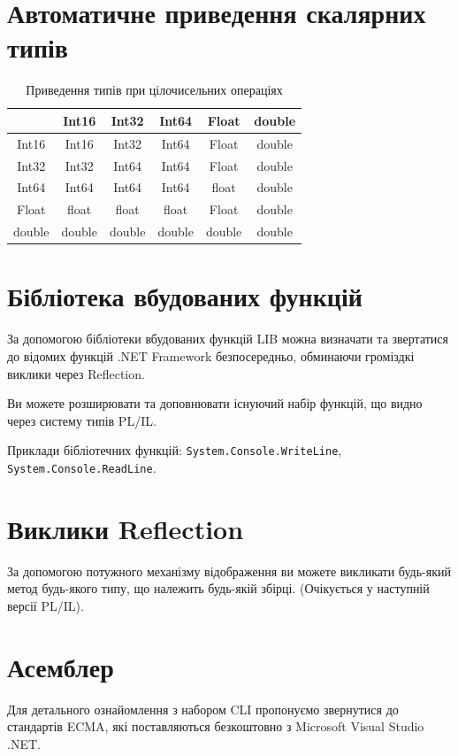 \documentclass{memoir}
\begin{document}
\section{Автоматичне приведення скалярних типів}
\begin{table}[h]
    \centering
    \caption{Приведення типів при цілочисельних операціях}
    \begin{tabular}{|c|c|c|c|c|c|}
        \hline
        & Int16 & Int32 & Int64 & Float & double \\
        \hline
        Int16 & Int16 & Int32 & Int64 & Float & double \\
        Int32 & Int32 & Int64 & Int64 & Float & double \\
        Int64 & Int64 & Int64 & Int64 & float & double \\
        Float & float & float & float & Float & double \\
        double & double & double & double & double & double \\
        \hline
    \end{tabular}
\end{table}

\section{Бібліотека вбудованих функцій}
За допомогою бібліотеки вбудованих функцій LIB можна визначати та звертатися до відомих функцій .NET Framework безпосередньо, обминаючи громіздкі виклики через Reflection.

Ви можете розширювати та доповнювати існуючий набір функцій, що видно через систему типів PL/IL.

Приклади бібліотечних функцій:
\texttt{System.Console.WriteLine},
\texttt{System.Console.ReadLine}.

\section{Виклики Reflection}

За допомогою потужного механізму відображення ви можете викликати
будь-який метод будь-якого типу, що належить будь-якій збірці.
(Очікується у наступній версії PL/IL).

\section{Асемблер}
Для детального ознайомлення з набором CLI пропонуємо звернутися до стандартів ECMA,
які поставляються безкоштовно з Microsoft Visual Studio .NET.
\end{document}

